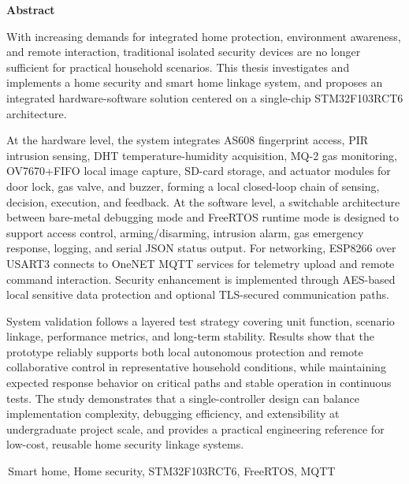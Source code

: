 \documentclass[UTF8,12pt,a4paper,oneside]{ctexbook}
\numberwithin{equation}{chapter}
\begin{document}
\vspace{0.5\baselineskip}
\clearpage
{}
{}
\begin{center}
{\bfseries{}Abstract}
\end{center}
\begin{sloppypar}
With increasing demands for integrated home protection, environment awareness, and remote interaction, traditional isolated security devices are no longer sufficient for practical household scenarios. This thesis investigates and implements a home security and smart home linkage system, and proposes an integrated hardware-software solution centered on a single-chip STM32F103RCT6 architecture.

At the hardware level, the system integrates AS608 fingerprint access, PIR intrusion sensing, DHT temperature-humidity acquisition, MQ-2 gas monitoring, OV7670+FIFO local image capture, SD-card storage, and actuator modules for door lock, gas valve, and buzzer, forming a local closed-loop chain of sensing, decision, execution, and feedback. At the software level, a switchable architecture between bare-metal debugging mode and FreeRTOS runtime mode is designed to support access control, arming/disarming, intrusion alarm, gas emergency response, logging, and serial JSON status output. For networking, ESP8266 over USART3 connects to OneNET MQTT services for telemetry upload and remote command interaction. Security enhancement is implemented through AES-based local sensitive data protection and optional TLS-secured communication paths.

System validation follows a layered test strategy covering unit function, scenario linkage, performance metrics, and long-term stability. Results show that the prototype reliably supports both local autonomous protection and remote collaborative control in representative household conditions, while maintaining expected response behavior on critical paths and stable operation in continuous tests. The study demonstrates that a single-controller design can balance implementation complexity, debugging efficiency, and extensibility at undergraduate project scale, and provides a practical engineering reference for low-cost, reusable home security linkage systems.
\end{sloppypar}

\vspace{1\baselineskip}
\,Smart home, Home security, STM32F103RCT6, FreeRTOS, MQTT
\end{document}
